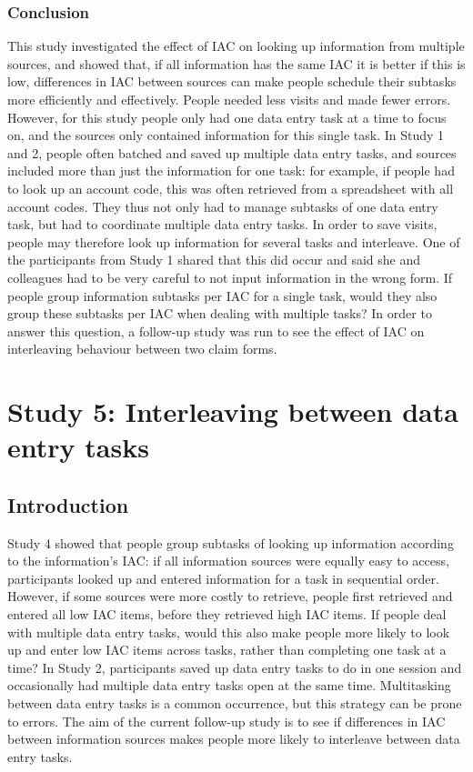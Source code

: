 \begin{table}
\begin{enumerate}
\subsubsection{Conclusion}
This study investigated the effect of IAC on looking up information from multiple sources, and showed that, if all information has the same IAC it is better if this is low, differences in IAC between sources can make people schedule their subtasks more efficiently and effectively. People needed less visits and made fewer errors. 
However, for this study people only had one data entry task at a time to focus on, and the sources only contained information for this single task. In Study 1 and 2, people often batched and saved up multiple data entry tasks, and sources included more than just the information for one task: for example, if people had to look up an account code, this was often retrieved from a spreadsheet with all account codes. They thus not only had to manage subtasks of one data entry task, but had to coordinate multiple data entry tasks. In order to save visits, people may therefore look up information for several tasks and interleave. One of the participants from Study 1 shared that this did occur and said she and colleagues had to be very careful to not input information in the wrong form. If people group information subtasks per IAC for a single task, would they also group these subtasks per IAC when dealing with multiple tasks? In order to answer this question, a follow-up study was run to see the effect of IAC on interleaving behaviour between two claim forms. 


\section{Study 5: Interleaving between data entry tasks}
 
\subsection{Introduction}
Study 4 showed that people group subtasks of looking up information according to the information's IAC: if all information sources were equally easy to access, participants looked up and entered information for a task in sequential order. However, if some sources were more costly to retrieve, people first retrieved and entered all low IAC items, before they retrieved high IAC items.
If people deal with multiple data entry tasks, would this also make people more likely to look up and enter low IAC items across tasks, rather than completing one task at a time? 
In Study 2, participants saved up data entry tasks to do in one session and occasionally had multiple data entry tasks open at the same time. Multitasking between data entry tasks is a common occurrence, but this strategy can be prone to errors.
The aim of the current follow-up study is to see if differences in IAC between information sources makes people more likely to interleave between data entry tasks.


\end{enumerate}
\end{table}
